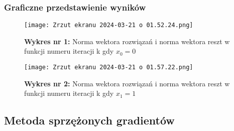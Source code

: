 \documentclass{article}
\begin{document}
\subsubsection{Graficzne przedstawienie wyników}
\begin{figure}[H]
    \centering
    \texttt{[image: Zrzut ekranu 2024-03-21 o 01.52.24.png]}
    \caption*{\textbf{Wykres nr 1:} Norma wektora rozwiązań i norma wektora reszt w funkcji numeru iteracji k gdy $x_0 = 0$}
    \label{fig:enter-label}
\end{figure}
\begin{figure}[H]
    \centering
    \texttt{[image: Zrzut ekranu 2024-03-21 o 01.57.22.png]}
    \caption*{\textbf{Wykres nr 2:} Norma wektora rozwiązań i norma wektora reszt w funkcji numeru iteracji k gdy $x_1 = 1$}
    \label{fig:enter-label}
\end{figure}
\newpage
\subsection{Metoda sprzężonych gradientów}
\end{document}
